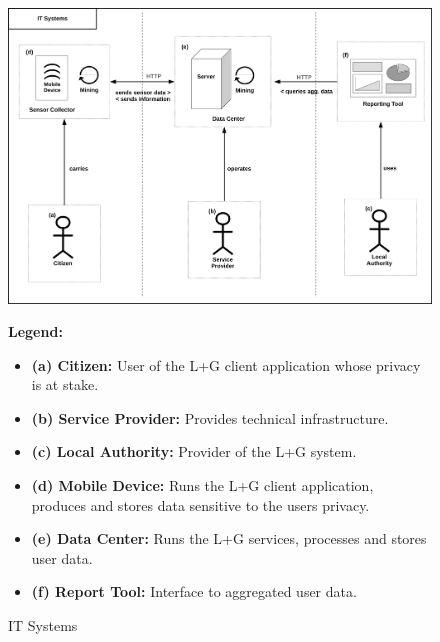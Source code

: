 \begin{figure}[h]
\centering
\includegraphics[width=\textwidth]{diagrams/png/it-systems.png}

\begin{flushleft}
\scriptsize
\textbf{Legend:}
\begin{itemize}
\itemsep1pt\parskip0pt

\item
\textbf{(a) Citizen:} 
User of the L+G client application whose privacy is at stake.

\item
\textbf{(b) Service Provider:} Provides technical infrastructure.

\item
\textbf{(c) Local Authority:} Provider of the L+G system.

\item
\textbf{(d) Mobile Device:}
Runs the L+G client application, produces and stores data sensitive to the users privacy.

\item
\textbf{(e) Data Center:} Runs the L+G services, processes and stores user data.

\item
\textbf{(f) Report Tool:} Interface to aggregated user data.

\end{itemize}
\end{flushleft}

\caption{IT Systems}
\label{figure:IT Systems}
\end{figure}
